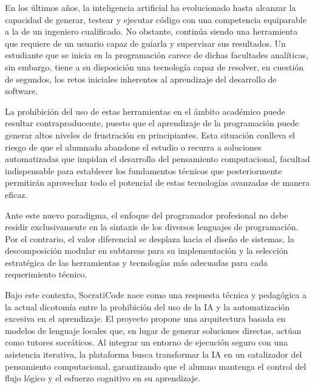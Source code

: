 En los últimos años, la inteligencia artificial ha evolucionado hasta alcanzar la capacidad de generar, testear y ejecutar código con una competencia equiparable a la de un ingeniero cualificado. No obstante, continúa siendo una herramienta que requiere de un usuario capaz de guiarla y supervisar sus resultados. Un estudiante que se inicia en la programación carece de dichas facultades analíticas, sin embargo, tiene a su disposición una tecnología capaz de resolver, en cuestión de segundos, los retos iniciales inherentes al aprendizaje del desarrollo de software.

La prohibición del uso de estas herramientas en el ámbito académico puede resultar contraproducente, puesto que el aprendizaje de la programación puede generar altos niveles de frustración en principiantes. Esta situación conlleva el riesgo de que el alumnado abandone el estudio o recurra a soluciones automatizadas que impidan el desarrollo del pensamiento computacional, facultad indispensable para establecer los fundamentos técnicos que posteriormente permitirán aprovechar todo el potencial de estas tecnologías avanzadas de manera eficaz.

Ante este nuevo paradigma, el enfoque del programador profesional no debe residir exclusivamente en la sintaxis de los diversos lenguajes de programación. Por el contrario, el valor diferencial se desplaza hacia el diseño de sistemas, la descomposición modular en subtareas para su implementación y la selección estratégica de las herramientas y tecnologías más adecuadas para cada requerimiento técnico.

Bajo este contexto, SocratiCode nace como una respuesta técnica y pedagógica a la actual dicotomía entre la prohibición del uso de la IA y la automatización excesiva en el aprendizaje. El proyecto propone una arquitectura basada en modelos de lenguaje locales que, en lugar de generar soluciones directas, actúan como tutores socráticos. Al integrar un entorno de ejecución seguro con una asistencia iterativa, la plataforma busca transformar la IA en un catalizador del pensamiento computacional, garantizando que el alumno mantenga el control del flujo lógico y el esfuerzo cognitivo en su aprendizaje.